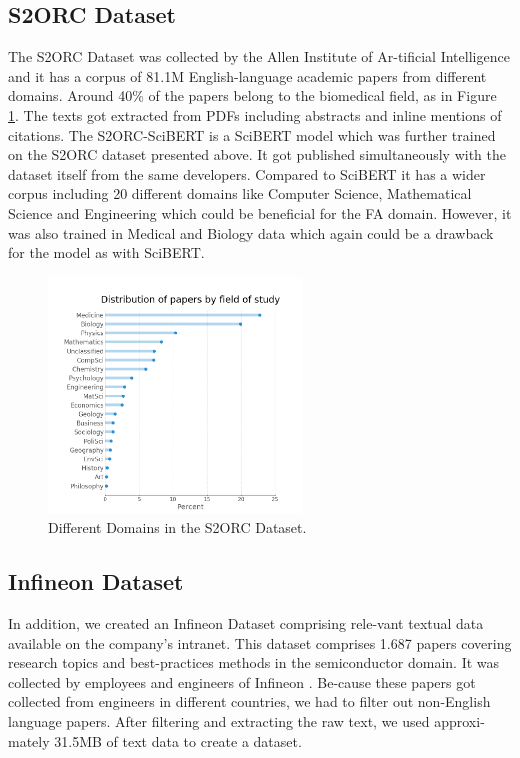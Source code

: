 \subsection{S2ORC Dataset}
The S2ORC Dataset was collected by the Allen Institute of Ar-tificial  Intelligence  and  it  has  a  corpus  of 81.1M  English-language academic papers from different domains. Around 40\% of the papers belong to the  biomedical field, as in Figure \ref{fig:domains}. The texts  got  extracted  from  PDFs  including  abstracts  and  inline mentions of citations.
The S2ORC-SciBERT is a SciBERT model which was further trained on the S2ORC dataset presented above. It got published simultaneously with the dataset itself from the same developers. Compared to SciBERT it has a wider corpus including 20 different  domains like  Computer  Science,  Mathematical  Science and Engineering which could be beneficial for the FA domain. However, it was also trained in Medical and Biology data which again could be a drawback for the model as with SciBERT.

\begin{figure}[H]
	\centering
	\includegraphics[width=0.6\textwidth]{figures/S2ORC_Domains.PNG}
	\caption{Different Domains in the S2ORC Dataset.}
	\label{fig:domains}
\end{figure}

\subsection{Infineon Dataset}
In addition, we created an Infineon Dataset comprising rele-vant textual data available on the company’s intranet. This dataset comprises 1.687 papers covering research topics and best-practices methods in the semiconductor domain. It was collected by employees and engineers of Infineon . Be-cause these papers got collected from engineers in different countries, we had to filter out non-English language papers. After filtering and extracting the raw text, we used approxi-mately 31.5MB of text data to create a dataset.

